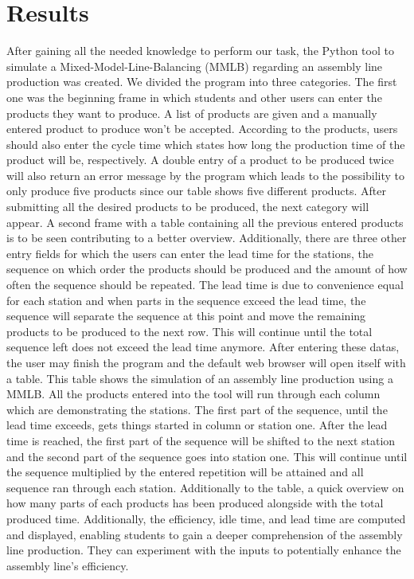 \section{Results}
After gaining all the needed knowledge to perform our task, the Python tool to simulate a Mixed-Model-Line-Balancing (MMLB) regarding an assembly line production was created. We divided the program into three categories. The first one was the beginning frame in which students and other users can enter the products they want to produce. A list of products are given and a manually entered product to produce won't be accepted. According to the products, users should also enter the cycle time which states how long the production time of the product will be, respectively. A double entry of a product to be produced twice will also return an error message by the program which leads to the possibility to only produce five products since our table shows five different products. After submitting all the desired products to be produced, the next category will appear. A second frame with a table containing all the previous entered products is to be seen contributing to a better overview. Additionally, there are three other entry fields for which the users can enter the lead time for the stations, the sequence on which order the products should be produced and the amount of how often the sequence should be repeated. The lead time is due to convenience equal for each station and when parts in the sequence exceed the lead time, the sequence will separate the sequence at this point and move the remaining products to be produced to the next row. This will continue until the total sequence left does not exceed the lead time anymore. After entering these datas, the user may finish the program and the default web browser will open itself with a table. This table shows the simulation of an assembly line production using a MMLB. All the products entered into the tool will run through each column which are demonstrating the stations. The first part of the sequence, until the lead time exceeds, gets things started in column or station one. After the lead time is reached, the first part of the sequence will be shifted to the next station and the second part of the sequence goes into station one. This will continue until the sequence multiplied by the entered repetition will be attained and all sequence ran through each station. Additionally to the table, a quick overview on how many parts of each products has been produced alongside with the total produced time. Additionally, the efficiency, idle time, and lead time are computed and displayed, enabling students to gain a deeper comprehension of the assembly line production. They can experiment with the inputs to potentially enhance the assembly line's efficiency.
\vspace{-0.3cm}
